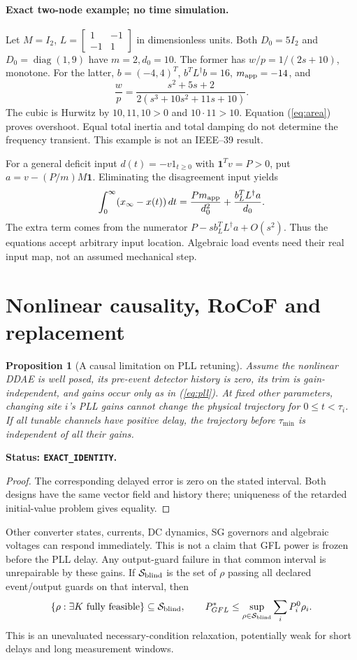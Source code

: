 \documentclass[11pt]{article}
\newtheorem{proposition}[theorem]{Proposition}
\newcommand{\diag}{\operatorname{diag}}
\newcommand{\one}{\mathbf{1}}
\newcommand{\status}[1]{\par\smallskip\noindent\textbf{Status: \texttt{#1}.}\ }
\begin{document}
\paragraph{Exact two-node example; no time simulation.}
Let $M=I_2$, $L=\left[\begin{smallmatrix}1&-1\\-1&1\end{smallmatrix}\right]$
in dimensionless units. Both $D_0=5I_2$ and $D_0=\diag(1,9)$ have
$m=2,d_0=10$. The former has $w/p=1/(2s+10)$, monotone.
For the latter, $b=(-4,4)^T$, $b^TL^\dagger b=16$, $m_{\rm app}=-14$,
and
\[
 \frac{w}{p}=\frac{s^2+5s+2}{2(s^3+10s^2+11s+10)}.
\]
The cubic is Hurwitz by $10,11,10>0$ and $10\cdot11>10$.
Equation (\ref{eq:area}) proves overshoot. Equal total inertia and
total damping do not determine the frequency transient.
This example is not an IEEE--39 result.

For a general deficit input $d(t)=-v1_{t\geq0}$ with $\one^Tv=P>0$,
put $a=v-(P/m)M\one$. Eliminating the disagreement input yields
\begin{equation}
 \int_0^\infty(x_\infty-x(t))\,dt
 =\frac{P m_{\rm app}}{d_0^2}+\frac{b_L^TL^\dagger a}{d_0}. \label{eq:location}
\end{equation}
The extra term comes from the numerator $P-s b_L^TL^\dagger a+O(s^2)$.
Thus the equations accept arbitrary input location. Algebraic load
events need their real input map, not an assumed mechanical step.

\section{Nonlinear causality, RoCoF and replacement}
\begin{proposition}[A causal limitation on PLL retuning]
Assume the nonlinear DDAE is well posed, its pre-event detector history
is zero, its trim is gain-independent, and gains occur only as in
(\ref{eq:pll}). At fixed other parameters, changing site $i$'s PLL
gains cannot change the physical trajectory for $0\leq t<\tau_i$.
If all tunable channels have positive delay, the trajectory before
$\tau_{\min}$ is independent of all their gains.
\end{proposition}
\status{EXACT\_IDENTITY}
\begin{proof}
The corresponding delayed error is zero on the stated interval.
Both designs have the same vector field and history there;
uniqueness of the retarded initial-value problem gives equality.
\end{proof}
Other converter states, currents, DC dynamics, SG governors and
algebraic voltages can respond immediately. This is not a claim
that GFL power is frozen before the PLL delay.
Any output-guard failure in that common interval is unrepairable
by these gains. If $\mathcal S_{\rm blind}$ is the set of $\rho$
passing all declared event/output guards on that interval, then
\[
 \{\rho:\exists K\ \text{fully feasible}\}\subseteq\mathcal S_{\rm blind},
 \qquad
 P_{GFL}^*\leq\sup_{\rho\in\mathcal S_{\rm blind}}\sum_iP_i^0\rho_i .
\]
This is an unevaluated necessary-condition relaxation, potentially
weak for short delays and long measurement windows.
\end{document}
